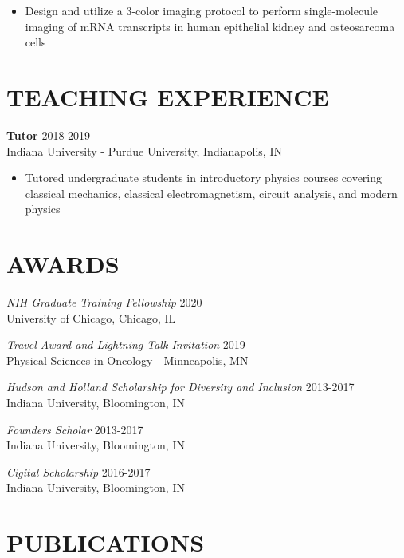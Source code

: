 \documentclass[margin, 10pt]{res} %
\begin{document}
\begin{resume}
\begin{itemize}
\item Design and utilize a 3-color imaging protocol to perform single-molecule imaging of mRNA transcripts in human epithelial kidney and osteosarcoma cells 

\end{itemize} 

\section{TEACHING EXPERIENCE}

\textbf{Tutor} \hfill 2018-2019\\
Indiana University - Purdue University, Indianapolis, IN
\begin{itemize} \itemsep -2pt %

\item Tutored undergraduate students in introductory physics courses covering classical mechanics, classical electromagnetism, circuit analysis, and modern physics

\end{itemize} 



\section{AWARDS}

{\sl NIH Graduate Training Fellowship} \hfill 2020 \\
University of Chicago, Chicago, IL

{\sl Travel Award and Lightning Talk Invitation} \hfill 2019 \\
Physical Sciences in Oncology - Minneapolis, MN

{\sl Hudson and Holland Scholarship for Diversity and Inclusion} \hfill 2013-2017 \\
Indiana University, Bloomington, IN 

{\sl Founders Scholar} \hfill 2013-2017 \\
Indiana University, Bloomington, IN 

{\sl Cigital Scholarship} \hfill 2016-2017 \\
Indiana University, Bloomington, IN 

\section{PUBLICATIONS}


\end{resume}
\end{document}

